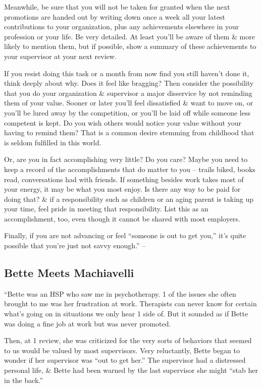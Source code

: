 \documentclass{article}
\numberwithin{equation}{section}
\begin{document}
Meanwhile, be sure that you will not be taken for granted when the next promotions are handed out by writing down once a week all your latest contributions to your organization, plus any achievements elsewhere in your profession or your life. Be very detailed. At least you'll be aware of them \& more likely to mention them, but if possible, show a summary of these achievements to your supervisor at your next review.

If you resist doing this task or a month from now find you still haven't done it, think deeply about why. Does it feel like bragging? Then consider the possibility that you do your organization \& supervisor a major disservice by not reminding them of your value. Sooner or later you'll feel dissatisfied \& want to move on, or you'll be lured away by the competition, or you'll be laid off while someone less competent is kept. Do you wish others would notice your value without your having to remind them? That is a common desire stemming from childhood that is seldom fulfilled in this world.

Or, are you in fact accomplishing very little? Do you care? Maybe you need to keep a record of the accomplishments that do matter to you -- trails biked, books read, conversations had with friends. If something besides work takes most of your energy, it may be what you most enjoy. Is there any way to be paid for doing that? \& if a responsibility such as children or an aging parent is taking up your time, feel pride in meeting that responsibility. List this as an accomplishment, too, even though it cannot be shared with most employers.

Finally, if you are not advancing or feel ``someone is out to get you,'' it's quite possible that you're just not savvy enough.'' -- \cite[pp. 164--165]{Aron2013}

\subsection{Bette Meets Machiavelli}
``Bette was an HSP who saw me in psychotherapy. 1 of the issues she often brought to me was her frustration at work. Therapists can never know for certain what's going on in situations we only hear 1 side of. But it sounded as if Bette was doing a fine job at work but was never promoted.

Then, at 1 review, she was criticized for the very sorts of behaviors that seemed to us would be valued by most supervisors. Very reluctantly, Bette began to wonder if her supervisor was ``out to get her.'' The supervisor had a distressed personal life, \& Bette had been warned by the last supervisor she might ``stab her in the back.''
\end{document}
